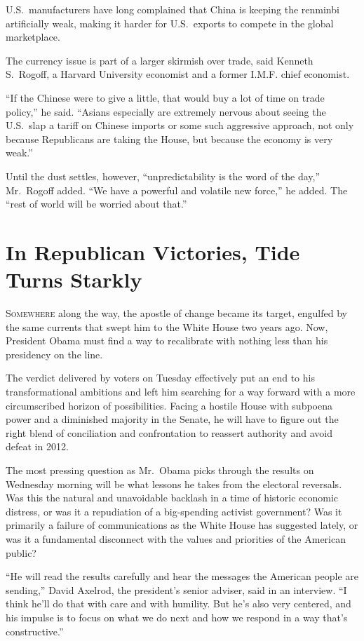 ﻿\documentclass[12pt]{article}
\begin{document}
U.S.~manufacturers have long complained that China is keeping the renminbi artificially weak, making
it harder for U.S.~exports to compete in the global marketplace.

The currency issue is part of a larger skirmish over trade, said Kenneth S.~Rogoff, a Harvard
University economist and a former I.M.F. chief economist.

``If the Chinese were to give a little, that would buy a lot of time on trade policy,'' he said.
``Asians especially are extremely nervous about seeing the U.S.~slap a tariff on Chinese imports or
some such aggressive approach, not only because Republicans are taking the House, but because the
economy is very weak.''

Until the dust settles, however, ``unpredictability is the word of the day,'' Mr.~Rogoff added. ``We
have a powerful and volatile new force,'' he added. The ``rest of world will be worried about
that.''

\section{In Republican Victories, Tide Turns Starkly}

\lettrine{S}{omewhere} along the way, the apostle of change became its
target, engulfed by the same currents that swept him to the White House two years ago. Now,
President Obama must find a way to recalibrate with nothing less than his presidency on the line.

The verdict delivered by voters on Tuesday effectively put an end to his transformational ambitions
and left him searching for a way forward with a more circumscribed horizon of possibilities. Facing
a hostile House with subpoena power and a diminished majority in the Senate, he will have to figure
out the right blend of conciliation and confrontation to reassert authority and avoid defeat in
2012.

The most pressing question as Mr.~Obama picks through the results on Wednesday morning will be what
lessons he takes from the electoral reversals. Was this the natural and unavoidable backlash in a
time of historic economic distress, or was it a repudiation of a big-spending activist government?
Was it primarily a failure of communications as the White House has suggested lately, or was it a
fundamental disconnect with the values and priorities of the American public?

``He will read the results carefully and hear the messages the American people are sending,'' David
Axelrod, the president's senior adviser, said in an interview. ``I think he'll do that with care and
with humility. But he's also very centered, and his impulse is to focus on what we do next and how
we respond in a way that's constructive.''
\end{document}

